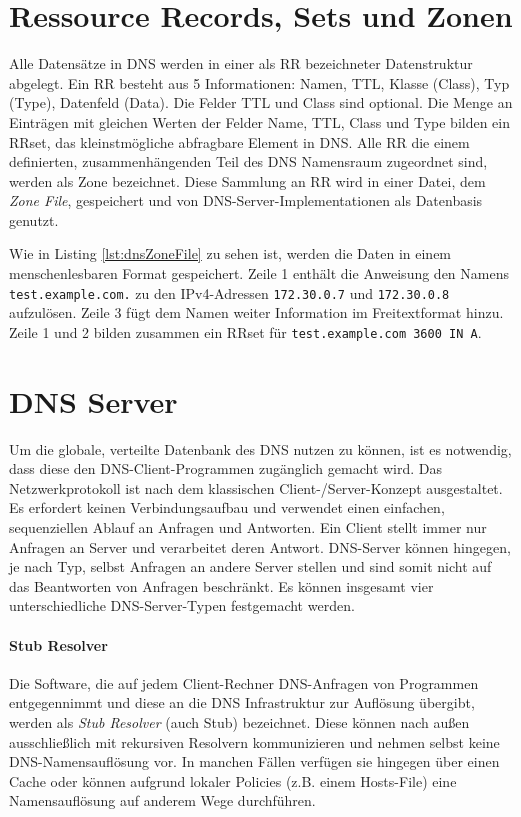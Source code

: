\section{Ressource Records, Sets und Zonen}
Alle Datensätze in DNS werden in einer als \ac{RR} bezeichneter Datenstruktur abgelegt. Ein \ac{RR} besteht aus 5 Informationen: Namen, \ac{TTL}, Klasse (Class), Typ (Type), Datenfeld (Data). Die Felder \ac{TTL} und Class sind optional. Die Menge an Einträgen mit gleichen Werten der Felder Name, TTL, Class und Type bilden ein \ac{RRset}\cite{rfc2181}, das kleinstmögliche abfragbare Element in DNS. Alle \ac{RR} die einem definierten, zusammenhängenden Teil des DNS Namensraum zugeordnet sind, werden als Zone bezeichnet. Diese Sammlung an RR wird in einer Datei, dem \textit{Zone File}, gespeichert und von DNS-Server-Implementationen als Datenbasis genutzt.   

Wie in Listing \ref{lst:dnsZoneFile} zu sehen ist, werden die Daten in einem menschenlesbaren Format gespeichert. Zeile 1 enthält die Anweisung den Namens \texttt{test.example.com.} zu den IPv4-Adressen \texttt{172.30.0.7} und \texttt{172.30.0.8} aufzulösen. Zeile 3 fügt dem Namen weiter Information im Freitextformat hinzu. Zeile 1 und 2 bilden zusammen ein RRset für \texttt{test.example.com 3600 IN A}.



\section{DNS Server}
\label{sec:dnsserver}
Um die globale, verteilte Datenbank des DNS nutzen zu können, ist es notwendig, dass diese den DNS-Client-Programmen zugänglich gemacht wird. Das Netzwerkprotokoll ist nach dem klassischen Client-/Server-Konzept ausgestaltet. Es erfordert keinen Verbindungsaufbau und verwendet einen einfachen, sequenziellen Ablauf an Anfragen und Antworten. Ein Client stellt immer nur Anfragen an Server und verarbeitet deren Antwort. DNS-Server können hingegen, je nach Typ, selbst Anfragen an andere Server stellen und sind somit nicht auf das Beantworten von Anfragen beschränkt. Es können insgesamt vier unterschiedliche DNS-Server-Typen festgemacht werden.

\paragraph{Stub Resolver}
Die Software, die auf jedem Client-Rechner DNS-Anfragen von Programmen entgegennimmt und diese an die DNS Infrastruktur zur Auflösung übergibt, werden als \textit{Stub Resolver} (auch Stub) bezeichnet. Diese können nach außen ausschließlich mit rekursiven Resolvern kommunizieren und nehmen selbst keine DNS-Namensauflösung vor. In manchen Fällen verfügen sie hingegen über einen Cache oder können aufgrund lokaler Policies (z.B. einem Hosts-File) eine Namensauflösung auf anderem Wege durchführen.

